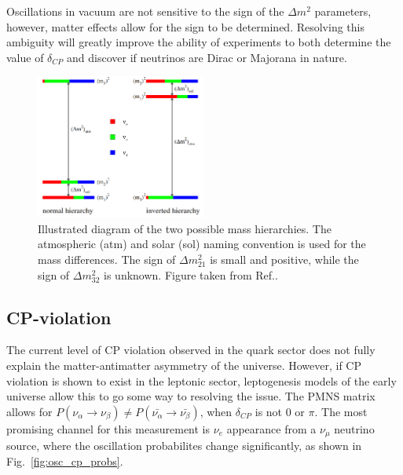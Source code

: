 Oscillations in vacuum are not sensitive to the sign of the $\Delta m^{2}$ parameters, however,
matter effects allow for the sign to be determined. Resolving this ambiguity will greatly improve
the ability of experiments to both determine the value of $\delta_{CP}$ and discover if neutrinos
are Dirac or Majorana in nature.

\begin{figure} %
    \includegraphics[origin=c,width=0.5\textwidth]{diagrams/3-theory/hierarchy.png}
    \caption[hierarchy short]
    {Illustrated diagram of the two possible mass hierarchies. The atmospheric (atm) and solar
        (sol) naming convention is used for the mass differences. The sign of
        $\Delta m_{21}^{2}$ is small and positive, while the sign of $\Delta m_{32}^{2}$ is
        unknown. Figure taken from Ref.\cite{gouvea2013}.}
    \label{fig:hierarchy}
\end{figure} %

\subsection{CP-violation}

The current level of CP violation observed in the quark sector does not fully explain the
matter-antimatter asymmetry of the universe. However, if CP violation is shown to exist in the
leptonic sector, leptogenesis models of the early universe allow this to go some way to resolving
the issue. The PMNS matrix allows for
$P(\nu_{\alpha}\rightarrow\nu_{\beta}) \neq P(\bar{\nu_{\alpha}}\rightarrow\bar{\nu_{\beta}})$,
when $\delta_{CP}$ is not 0 or $\pi$. The most promising channel for this measurement is $\nu_{e}$
appearance from a $\nu_{\mu}$ neutrino source, where the oscillation probabilites change
significantly, as shown in Fig.~\ref{fig:osc_cp_probs}.

